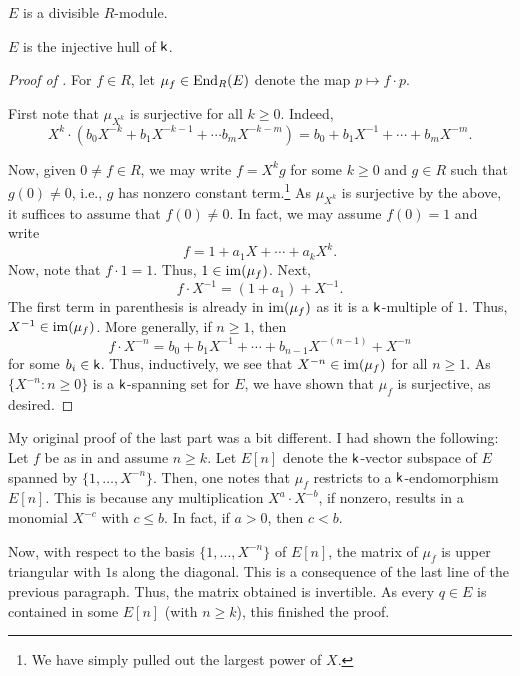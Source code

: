 \begin{prop} \label{prop:E1-divisible}
	$E$ is a divisible $R$-module.
\end{prop}

\begin{cor}
	$E$ is the injective hull of $\mathsf{k}$.
\end{cor}

\begin{proof}[Proof of ]
	For $f \in R$, let $\mu_{f} \in \operatorname{End}_{R}(E)$ denote the map $p \mapsto f \cdot p$. 
	
	First note that $\mu_{X^{k}}$ is surjective for all $k \ge 0$. Indeed,
	\begin{equation*} 
		X^{k} \cdot (b_{0} X^{-k} + b_{1} X^{-k - 1} + \cdots b_{m} X^{-k - m}) = b_{0} + b_{1} X^{-1} + \cdots + b_{m} X^{-m}.
	\end{equation*}

	Now, given $0 \neq f \in R$, we may write $f = X^{k} g$ for some $k \ge 0$ and $g \in R$ such that $g(0) \neq 0$, i.e., $g$ has nonzero constant term.\footnote{We have simply pulled out the largest power of $X$.} As $\mu_{X^{k}}$ is surjective by the above, it suffices to assume that $f(0) \neq 0$. In fact, we may assume $f(0) = 1$ and write
	\begin{equation} \label{eq:03}
		f = 1 + a_{1} X + \cdots + a_{k} X^{k}.
	\end{equation}
	Now, note that $f \cdot 1 = 1$. Thus, $1 \in \operatorname{im}(\mu_{f})$. Next,
	\begin{equation*} 
		f \cdot X^{-1} = (1 + a_{1}) + X^{-1}.
	\end{equation*}
	The first term in parenthesis is already in $\operatorname{im}(\mu_{f})$ as it is a $\mathsf{k}$-multiple of $1$. Thus, $X^{-1} \in \operatorname{im}(\mu_{f})$. More generally, if $n \ge 1$, then 
	\begin{equation*} 
		f \cdot X^{-n} = b_{0} + b_{1} X^{-1} + \cdots + b_{n - 1} X^{-(n - 1)} + X^{-n}
	\end{equation*}
	for some $b_{i} \in \mathsf{k}$. Thus, inductively, we see that $X^{-n} \in \operatorname{im}(\mu_{f})$ for all $n \ge 1$. As $\{X^{-n} : n \ge 0\}$ is a $\mathsf{k}$-spanning set for $E$, we have shown that $\mu_{f}$ is surjective, as desired.
\end{proof}

\begin{rem}
	My original proof of the last part was a bit different. I had shown the following: Let $f$ be as in  and assume $n \ge k$. Let $E[n]$ denote the $\mathsf{k}$-vector subspace of $E$ spanned by $\{1, \ldots, X^{-n}\}$. Then, one notes that $\mu_{f}$ restricts to a $\mathsf{k}$-endomorphism $E[n]$. This is because any multiplication $X^{a} \cdot X^{-b}$, if nonzero, results in a monomial $X^{-c}$ with $c \le b$. In fact, if $a > 0$, then $c < b$.

	Now, with respect to the basis $\{1, \ldots, X^{-n}\}$ of $E[n]$, the matrix of $\mu_{f}$ is upper triangular with $1$s along the diagonal. This is a consequence of the last line of the previous paragraph. \newline
	Thus, the matrix obtained is invertible. As every $q \in E$ is contained in some $E[n]$ (with $n \ge k$), this finished the proof.
\end{rem}

